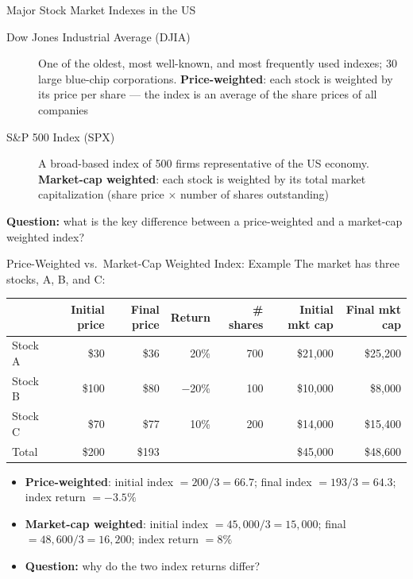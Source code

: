 \documentclass[aspectratio=169]{beamer}
\begin{document}
\begin{frame}{Major Stock Market Indexes in the US}
\begin{description}
  \item[Dow Jones Industrial Average (DJIA)] One of the oldest, most well-known, and most frequently used indexes; 30 large blue-chip corporations. \textbf{Price-weighted}: each stock is weighted by its price per share --- the index is an average of the share prices of all companies
  \item[S\&P 500 Index (SPX)] A broad-based index of 500 firms representative of the US economy. \textbf{Market-cap weighted}: each stock is weighted by its total market capitalization (share price $\times$ number of shares outstanding)
\end{description}
\vspace{0.4em}
\textbf{Question:} what is the key difference between a price-weighted and a market-cap weighted index?
\end{frame}

\begin{frame}{Price-Weighted vs.\ Market-Cap Weighted Index: Example}
The market has three stocks, A, B, and C:
\begin{table}
\centering
\small
\begin{tabular}{lrrrrrr}
\toprule
 & \textbf{Initial price} & \textbf{Final price} & \textbf{Return} & \textbf{\# shares} & \textbf{Initial mkt cap} & \textbf{Final mkt cap} \\
\midrule
Stock A & \$30 & \$36 & 20\% & 700 & \$21,000 & \$25,200 \\
Stock B & \$100 & \$80 & $-$20\% & 100 & \$10,000 & \$8,000 \\
Stock C & \$70 & \$77 & 10\% & 200 & \$14,000 & \$15,400 \\
Total & \$200 & \$193 & & & \$45,000 & \$48,600 \\
\bottomrule
\end{tabular}
\end{table}
\begin{itemize}
  \item \textbf{Price-weighted}: initial index $= 200/3 = 66.7$; final index $= 193/3 = 64.3$; index return $= -3.5\%$
  \item \textbf{Market-cap weighted}: initial index $= 45{,}000/3 = 15{,}000$; final $= 48{,}600/3 = 16{,}200$; index return $= 8\%$
  \item \textbf{Question:} why do the two index returns differ?
\end{itemize}
\end{frame}
\end{document}
